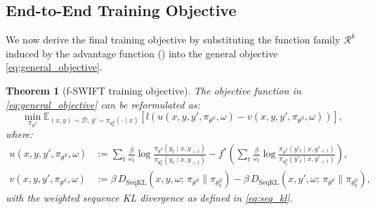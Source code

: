 \documentclass[11pt,a4paper]{article}
\newtheorem{theorem}{Theorem}[section]
\newcommand{\E}{\mathbb{E}}
\newcommand{\DSeqKL}{D_{\mathrm{SeqKL}}}
\begin{document}
\subsection{End-to-End Training Objective}
\label{subsec:end_to_end}

We now derive the final training objective by substituting the function family $\mathcal{R}^k$ induced by the advantage function () into the general objective \eqref{eq:general_objective}.

\begin{theorem}[f-SWIFT training objective]
\label{thm:f_swift_objective}
The objective function in \eqref{eq:general_objective} can be reformulated as:
\begin{equation}
    \min_{\pi_{\theta^S}} \E_{(x,y) \sim \mathcal{D},\, y' \sim \pi_{\theta^S_k}(\cdot \mid x)} \left[ l\!\left(u(x, y, y', \pi_{\theta^S}, \omega) - v(x, y, y', \pi_{\theta^S}, \omega)\right) \right],
    \label{eq:f_swift_final}
\end{equation}
where:
\begin{align}
    u(x, y, y', \pi_{\theta^S}, \omega) &:= \sum_t \frac{\beta}{\omega_t} \log \frac{\pi_{\theta^S}(y_t \mid x, y_{<t})}{\pi_{\theta^S_k}(y_t \mid x, y_{<t})} - f^*\!\left(\sum_t \frac{\beta}{\omega_t} \log \frac{\pi_{\theta^S}(y'_t \mid x, y'_{<t})}{\pi_{\theta^S_k}(y'_t \mid x, y'_{<t})}\right), \label{eq:u_fswift} \\[6pt]
    v(x, y, y', \pi_{\theta^S}, \omega) &:= \beta\, \DSeqKL(x, y, \omega;\, \pi_{\theta^S} \| \pi_{\theta^S_k}) - \beta\, \DSeqKL(x, y', \omega;\, \pi_{\theta^S} \| \pi_{\theta^S_k}), \label{eq:v_fswift}
\end{align}
with the weighted sequence KL divergence as defined in \eqref{eq:seq_kl}.
\end{theorem}
\end{document}

